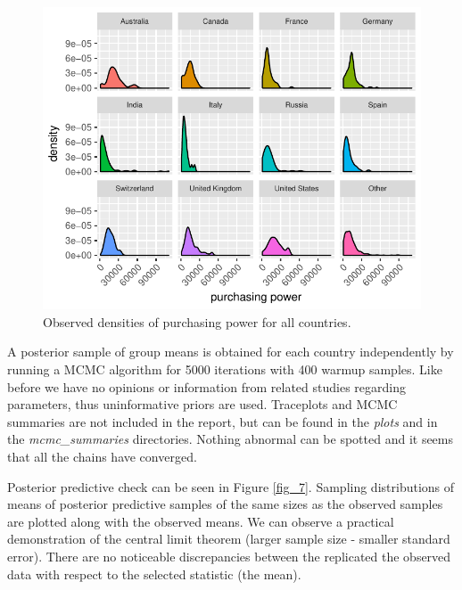 \documentclass{article}
\begin{document}
\begin{figure}[H]
\centering
\includegraphics{report-023}
\caption{Observed densities of purchasing power for all countries.}\label{fig_6}
\end{figure}

A posterior sample of group means is obtained for each country independently by running a MCMC algorithm for 5000 iterations with 400 warmup samples. Like before we have no opinions or information from related studies regarding parameters, thus uninformative priors are used. Traceplots and MCMC summaries are not included in the report, but can be found in the \textit{plots} and in the \textit{mcmc\_summaries} directories. Nothing abnormal can be spotted and it seems that all the chains have converged.

Posterior predictive check can be seen in Figure \ref{fig_7}. Sampling distributions of means of posterior predictive samples of the same sizes as the observed samples are plotted along with the observed means. We can observe a practical demonstration of the central limit theorem (larger sample size - smaller standard error). There are no noticeable discrepancies between the replicated the observed data with respect to the selected statistic (the mean).
\end{document}
